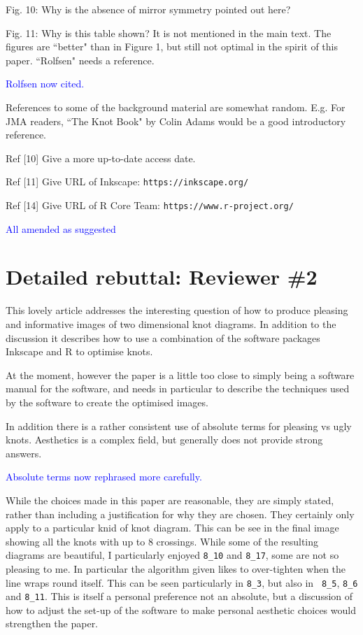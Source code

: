 \documentclass[12pt]{article}
\begin{document}
Fig. 10: Why is the absence of mirror symmetry pointed out here?

Fig. 11: Why is this table shown?  It is not mentioned in the main
text.  The figures are ``better" than in Figure 1, but still not
optimal in the spirit of this paper.  ``Rolfsen" needs a reference.


\textcolor{blue}{Rolfsen now cited.}

References to some of the background material are somewhat random.
E.g.  For JMA readers, ``The Knot Book" by Colin Adams would be a good
introductory reference.

Ref [10]  Give a more up-to-date access date.

Ref [11]  Give URL of  Inkscape:  {\tt https://inkscape.org/}

Ref [14]  Give URL of  R Core Team:  {\tt https://www.r-project.org/}


\textcolor{blue}{All amended as suggested}

\section*{Detailed rebuttal: Reviewer \#2}

This lovely article addresses the interesting question of
how to produce pleasing and informative images of two dimensional knot
diagrams. In addition to the discussion it describes how to use a
combination of the software packages Inkscape and R to optimise knots.

At the moment, however the paper is a little too close to simply being
a software manual for the software, and needs in particular to
describe the techniques used by the software to create the optimised
images.

In addition there is a rather consistent use of absolute terms for
pleasing vs ugly knots. Aesthetics is a complex field, but generally
does not provide strong answers.


\textcolor{blue}{Absolute terms now rephrased more carefully.}%

While the choices made in this paper
are reasonable, they are simply stated, rather than including a
justification for why they are chosen. They certainly only apply to a
particular knid of knot diagram. This can be see in the final image
showing all the knots with up to 8 crossings. While some of the
resulting diagrams are beautiful, I particularly enjoyed {\tt 8\_10}
and {\tt 8\_17}, some are not so pleasing to me. In particular the
algorithm given likes to over-tighten when the line wraps round
itself. This can be seen particularly in {\tt 8\_3}, but also in {\tt
  8\_5}, {\tt 8\_6} and {\tt 8\_11}. This is itself a personal
preference not an absolute, but a discussion of how to adjust the
set-up of the software to make personal aesthetic choices would
strengthen the paper.
\end{document}
